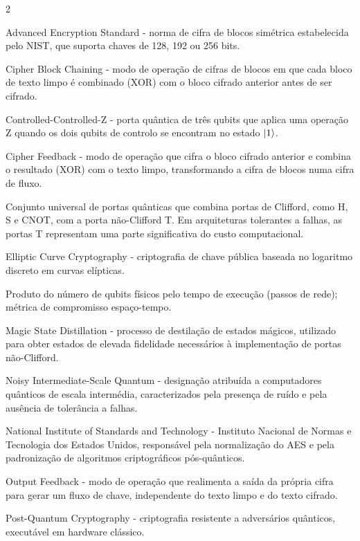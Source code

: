 \documentclass[11pt,a4paper]{article}
\begin{document}
\begin{multicols}{2}
\raggedcolumns
\begin{description}[style=nextline, leftmargin=0.9em, font=\small\bfseries, itemsep=2pt, topsep=1pt]
\small
\item[AES] Advanced Encryption Standard - norma de cifra de blocos simétrica estabelecida pelo NIST, que suporta chaves de 128, 192 ou 256 bits.
\item[CBC] Cipher Block Chaining - modo de operação de cifras de blocos em que cada bloco de texto limpo é combinado (XOR) com o bloco cifrado anterior antes de ser cifrado.
\item[CCZ] Controlled-Controlled-Z - porta quântica de três qubits que aplica uma operação Z quando os dois qubits de controlo se encontram no estado $\ket{1}$.
\item[CFB] Cipher Feedback - modo de operação que cifra o bloco cifrado anterior e combina o resultado (XOR) com o texto limpo, transformando a cifra de blocos numa cifra de fluxo.
\item[Clifford+T] Conjunto universal de portas quânticas que combina portas de Clifford, como H, S e CNOT, com a porta não-Clifford T. Em arquiteturas tolerantes a falhas, as portas T representam uma parte significativa do custo computacional.
\item[ECC] Elliptic Curve Cryptography -  criptografia de chave pública baseada no logaritmo discreto em curvas elípticas.
\item[KQ$_p$] Produto do número de qubits físicos pelo tempo de execução (passos de rede); métrica de compromisso espaço-tempo.
\item[MSD] Magic State Distillation - processo de destilação de estados mágicos, utilizado para obter estados de elevada fidelidade necessários à implementação de portas não-Clifford.
\item[NISQ] Noisy Intermediate-Scale Quantum -  designação atribuída a computadores quânticos de escala intermédia, caracterizados pela presença de ruído e pela ausência de tolerância a falhas.
\item[NIST] National Institute of Standards and Technology - Instituto Nacional de Normas e Tecnologia dos Estados Unidos, responsável pela normalização do AES e pela padronização de algoritmos criptográficos pós-quânticos.
\item[OFB] Output Feedback - modo de operação que realimenta a saída da própria cifra para gerar um fluxo de chave, independente do texto limpo e do texto cifrado.
\item[PQC] Post-Quantum Cryptography -  criptografia resistente a adversários quânticos, executável em hardware clássico.

\end{description}
\end{multicols}
\end{document}
